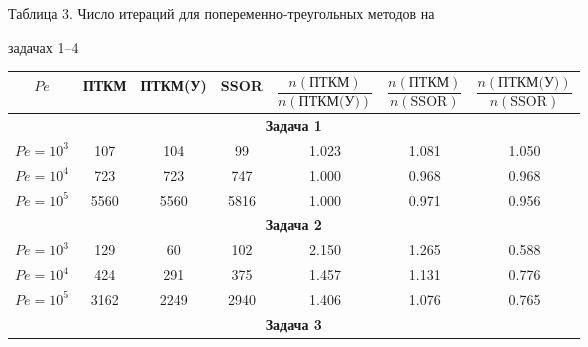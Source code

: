\begin{center} 


Таблица 3. Число итераций для попеременно-треугольных методов на 


задачах 1--4


\medskip





\begin{tabular}{|c|c|c|c|c|c|c|} 


\hline 


$Pe$ & ПТКМ & ПТКМ(У) & SSOR & 


$\dfrac{n(\text{ПТКМ})}{n(\text{ПТКМ(У)})}$ & 


$\dfrac{n(\text{ПТКМ})}{n(\text{SSOR})}$ & 


$\dfrac{n(\text{ПТКМ(У)})}{n(\text{SSOR})}$ \\ 


\hline 


\multicolumn{7}{|c|}{\bf Задача 1} \\ 


\hline 


$Pe=10^3$ & 107 & 104 & 99 & 1.023 & 1.081 & 1.050 \\ 


\hline 


$Pe=10^4$ & 723 & 723 & 747 & 1.000 & 0.968 & 0.968 \\ 


\hline 


$Pe=10^5$ & 5560 & 5560 & 5816 & 1.000 & 0.971 & 0.956 \\ 


\hline 


\multicolumn{7}{|c|}{\bf Задача 2} \\ 


\hline 


$Pe=10^3$ & 129 & 60 & 102 & 2.150 & 1.265 & 0.588 \\ 


\hline 


$Pe=10^4$ & 424 & 291 & 375 & 1.457 & 1.131 & 0.776 \\ 


\hline 


$Pe=10^5$ & 3162 & 2249 & 2940 & 1.406 & 1.076 & 0.765 \\ 


\hline 


\multicolumn{7}{|c|}{\bf Задача 3} \\ 


\hline 



\end{tabular}
\end{center}
